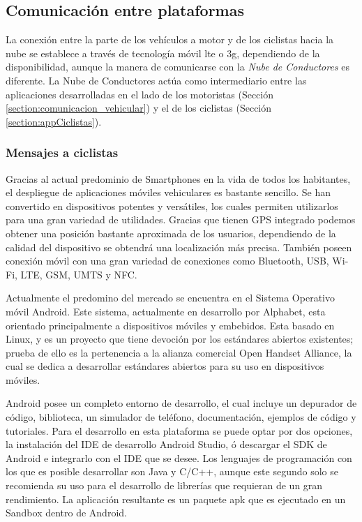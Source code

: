 \subsection{Comunicación entre plataformas}\label{ssection:comunicacion_plataformas}
La conexión entre la parte de los vehículos a motor y de los ciclistas hacia la nube
se establece a través de tecnología móvil \gls{lte} o \gls{3g}, dependiendo de la
disponibilidad, aunque la manera de comunicarse con la \emph{Nube de Conductores} es
diferente. La Nube de Conductores actúa como intermediario entre las aplicaciones
desarrolladas en el lado de los motoristas (Sección \ref{section:comunicacion_vehicular})
y el de los ciclistas (Sección \ref{section:appCiclistas}).

\subsubsection{Mensajes a ciclistas}\label{sssection:mensajes_ciclistas}
Gracias al actual predominio de Smartphones en la vida de todos los habitantes, el
despliegue de aplicaciones móviles vehiculares es bastante sencillo. Se han convertido
en dispositivos potentes y versátiles, los cuales permiten utilizarlos para una gran
variedad de utilidades. Gracias que tienen GPS integrado podemos obtener una posición
bastante aproximada de los usuarios, dependiendo de la calidad del dispositivo se obtendrá
una localización más precisa. También poseen conexión móvil con una gran variedad
de conexiones como Bluetooth, USB, Wi-Fi, LTE, GSM, UMTS y NFC.

Actualmente el predomino del mercado se encuentra en el Sistema Operativo móvil Android.
Este sistema, actualmente en desarrollo por Alphabet, esta orientado principalmente a
dispositivos móviles y embebidos. Esta basado en Linux, y es un proyecto que tiene
devoción por los estándares abiertos existentes; prueba de ello es la pertenencia a
la alianza comercial Open Handset Alliance, la cual se dedica a desarrollar estándares
abiertos para su uso en dispositivos móviles.

Android posee un completo entorno de desarrollo, el cual incluye un depurador de
código, biblioteca, un simulador de teléfono, documentación, ejemplos de código y
tutoriales. Para el desarrollo en esta plataforma se puede optar por dos opciones, la
instalación del IDE de desarrollo Android Studio, ó descargar el SDK de Android e
integrarlo con el IDE que se desee. Los lenguajes de programación con los que es
posible desarrollar son Java y C/C++, aunque este segundo solo se recomienda su uso
para el desarrollo de librerías que requieran de un gran rendimiento. La aplicación
resultante es un paquete apk que es ejecutado en un Sandbox dentro de Android.

